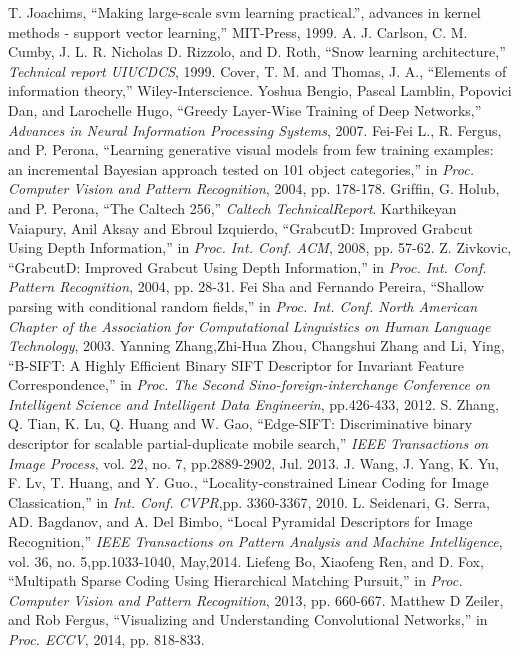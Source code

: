 \documentclass[journal]{IEEEtran}
\begin{document}
\begin{thebibliography}{1}
 T. Joachims, ``Making large-scale svm learning practical.”, advances in kernel methods - support vector learning,'' MIT-Press, 1999.
 A. J. Carlson, C. M. Cumby, J. L. R. Nicholas D. Rizzolo, and D. Roth, ``Snow learning architecture,'' \textit{Technical report UIUCDCS}, 1999.
 Cover, T. M. and Thomas, J. A., ``Elements of information theory,'' Wiley-Interscience.
 Yoshua Bengio, Pascal Lamblin, Popovici Dan, and Larochelle Hugo, ``Greedy Layer-Wise Training of Deep Networks,'' \textit{Advances in
Neural Information Processing Systems}, 2007.
 Fei-Fei L., R. Fergus, and P. Perona, ``Learning generative visual models from few training examples: an incremental Bayesian approach tested on 101 object categories,'' in \textit{Proc. Computer Vision and Pattern Recognition}, 2004, pp. 178-178.
 Grifﬁn, G. Holub, and P. Perona, ``The Caltech 256,'' \textit{Caltech TechnicalReport}.
 Karthikeyan Vaiapury, Anil Aksay and Ebroul Izquierdo, ``GrabcutD: Improved Grabcut Using Depth Information,'' in \textit{Proc. Int. Conf. ACM}, 2008, pp. 57-62.
 Z. Zivkovic, ``GrabcutD: Improved Grabcut Using Depth Information,'' in \textit{Proc. Int. Conf. Pattern Recognition}, 2004, pp. 28-31.
 Fei Sha and Fernando Pereira, ``Shallow parsing with conditional random ﬁelds,'' in \textit{Proc. Int. Conf. North American
Chapter of the Association for Computational Linguistics on Human Language Technology}, 2003.
 Yanning Zhang,Zhi-Hua Zhou, Changshui Zhang and Li, Ying, ``B-SIFT: A Highly Efficient Binary SIFT Descriptor for Invariant Feature Correspondence,'' in \textit{Proc. The Second Sino-foreign-interchange Conference on Intelligent Science and Intelligent Data Engineerin}, pp.426-433, 2012.
 S. Zhang, Q. Tian, K. Lu, Q. Huang and W. Gao, ``Edge-SIFT: Discriminative binary descriptor for scalable partial-duplicate mobile search,'' \textit{IEEE Transactions on Image Process}, vol. 22, no. 7, pp.2889-2902, Jul. 2013.
 J. Wang, J. Yang, K. Yu, F. Lv, T. Huang, and Y. Guo., ``Locality-constrained Linear Coding for Image Classication,'' in \textit{Int. Conf. CVPR},pp. 3360-3367, 2010.
 L. Seidenari, G. Serra, AD. Bagdanov, and A. Del Bimbo, ``Local Pyramidal Descriptors for Image Recognition,'' \textit{IEEE Transactions on Pattern Analysis and Machine Intelligence}, vol. 36, no. 5,pp.1033-1040, May,2014.
 Liefeng Bo, Xiaofeng Ren, and D. Fox, ``Multipath Sparse Coding Using Hierarchical Matching Pursuit,'' in \textit{Proc. Computer Vision and Pattern Recognition}, 2013, pp. 660-667.
 Matthew D Zeiler, and Rob Fergus, ``Visualizing and Understanding Convolutional Networks,'' in \textit{Proc. ECCV}, 2014,  pp. 818-833.
\end{thebibliography}
\end{document}
